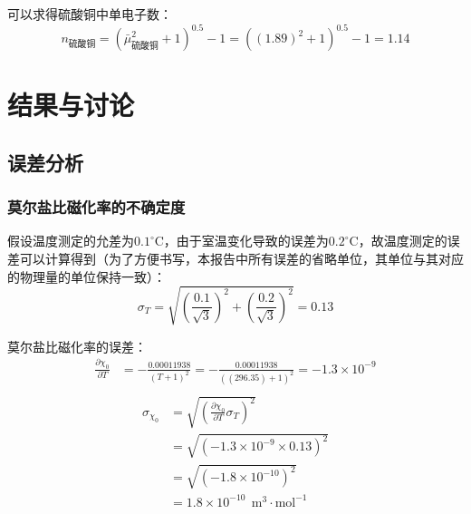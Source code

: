 \documentclass[cn,hazy,pku,12pt,normal,math=newtx,cite=super]{elegantnote}
\begin{document}
可以求得硫酸铜中单电子数：
\begin{equation*}
n_{\text{硫酸铜}}=\left(\bar{\mu}_{\text{硫酸铜}}^{2} + 1\right)^{0.5} - 1=\left(\left(1.89\right)^{2} + 1\right)^{0.5} - 1=1.14
\end{equation*}

\section{结果与讨论}

\subsection{误差分析}

\subsubsection{莫尔盐比磁化率的不确定度}

假设温度测定的允差为$0.1 ^\circ \mathrm{C}$，由于室温变化导致的误差为$0.2^\circ \mathrm{C}$，故温度测定的误差可以计算得到（为了方便书写，本报告中所有误差的省略单位，其单位与其对应的物理量的单位保持一致）：
\begin{equation*}
    \sigma_T = \sqrt{\left(\frac{0.1}{\sqrt{3}}\right)^2+\left(\frac{0.2}{\sqrt{3}}\right)^2} = 0.13 
\end{equation*}

莫尔盐比磁化率的误差：
\begin{equation*}
\begin{aligned}
\frac{\partial \chi_0 }{\partial T }&=- \frac{0.00011938}{\left(T + 1\right)^{2}}=- \frac{0.00011938}{\left(\left(296.35\right) + 1\right)^{2}}=-1.3 \times 10^{-9}\\ 
\end{aligned}
\end{equation*}
\begin{equation*}
\begin{aligned}
\sigma_{\chi_0}&=\sqrt{\left(\frac{\partial \chi_0 }{\partial T } \sigma_{T}\right)^2}\\
&=\sqrt{\left(-1.3 \times 10^{-9} \times 0.13\right)^2}\\
&=\sqrt{\left(-1.8 \times 10^{-10}\right)^2}\\
&=1.8 \times 10^{-10}\ \mathrm{~m^3\cdot mol^{-1}}
\end{aligned}
\end{equation*}
\end{document}
